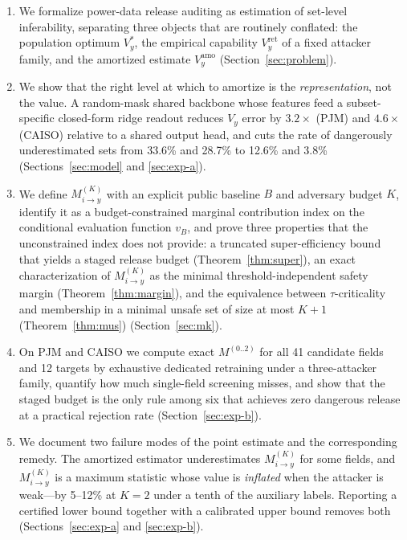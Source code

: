 \documentclass[preprint,12pt]{elsarticle}
\newcommand{\Vy}{V_{y}}
\newcommand{\Mik}{M^{(K)}_{i \to y}}
\begin{document}
\begin{enumerate}
\item We formalize power-data release auditing as estimation of set-level inferability,
separating three objects that are routinely conflated: the population optimum $\Vy^{*}$,
the empirical capability $\Vy^{\mathrm{ret}}$ of a fixed attacker family, and the amortized
estimate $\Vy^{\mathrm{amo}}$ (Section~\ref{sec:problem}).

\item We show that the right level at which to amortize is the \emph{representation}, not
the value. A random-mask shared backbone whose features feed a subset-specific closed-form
ridge readout reduces $\Vy$ error by $3.2\times$ (PJM) and $4.6\times$ (CAISO) relative to
a shared output head, and cuts the rate of dangerously underestimated sets from 33.6\% and
28.7\% to 12.6\% and 3.8\% (Sections~\ref{sec:model} and \ref{sec:exp-a}).

\item We define $\Mik$ with an explicit public baseline $B$ and adversary budget $K$,
identify it as a budget-constrained marginal contribution index on the conditional
evaluation function $v_B$, and prove three properties that the unconstrained index does not
provide: a truncated super-efficiency bound that yields a staged release budget
(Theorem~\ref{thm:super}), an exact characterization of $\Mik$ as the minimal
threshold-independent safety margin (Theorem~\ref{thm:margin}), and the equivalence between
$\tau$-criticality and membership in a minimal unsafe set of size at most $K+1$
(Theorem~\ref{thm:mus}) (Section~\ref{sec:mk}).

\item On PJM and CAISO we compute exact $M^{(0..2)}$ for all 41 candidate fields and 12
targets by exhaustive dedicated retraining under a three-attacker family, quantify how much
single-field screening misses, and show that the staged budget is the only rule among six
that achieves zero dangerous release at a practical rejection rate
(Section~\ref{sec:exp-b}).

\item We document two failure modes of the point estimate and the corresponding remedy.
The amortized estimator underestimates $\Mik$ for some fields, and $\Mik$ is a maximum
statistic whose value is \emph{inflated} when the attacker is weak---by 5--12\% at $K=2$
under a tenth of the auxiliary labels. Reporting a certified lower bound together with a
calibrated upper bound removes both (Sections~\ref{sec:exp-a} and \ref{sec:exp-b}).
\end{enumerate}
\end{document}
